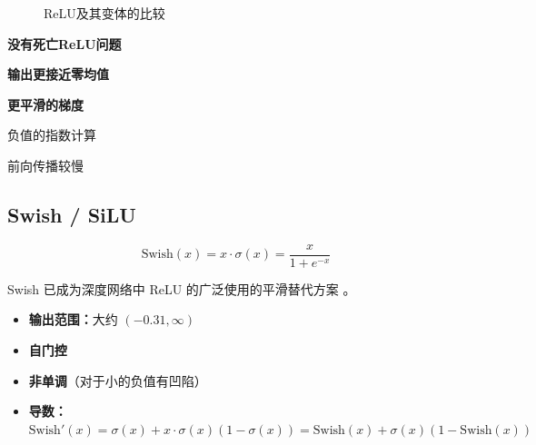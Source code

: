 \begin{figure}[htbp]
    \centering
    \caption[ReLU变体比较]{ReLU及其变体的比较}
    \label{fig:relu_variants}
\end{figure}

\begin{advantages}
    \item \textbf{没有死亡ReLU问题}
    \item \textbf{输出更接近零均值}
    \item \textbf{更平滑的梯度}
\end{advantages}

\begin{disadvantages}
    \item 负值的指数计算
    \item 前向传播较慢
\end{disadvantages}

\subsection{Swish / SiLU}

\begin{equation}
\text{Swish}(x) = x \cdot \sigma(x) = \frac{x}{1 + e^{-x}}
\end{equation}

Swish 已成为深度网络中 ReLU 的广泛使用的平滑替代方案 \cite{ramachandran2017searching}。

\begin{properties}[Swish的性质]
\begin{itemize}
    \item \textbf{输出范围：}大约 $(-0.31, \infty)$
    \item \textbf{自门控}
    \item \textbf{非单调}（对于小的负值有凹陷）
    \item \textbf{导数：}$\text{Swish}'(x) = \sigma(x) + x \cdot \sigma(x)(1 - \sigma(x)) = \text{Swish}(x) + \sigma(x)(1 - \text{Swish}(x))$
\end{itemize}
\end{properties}

